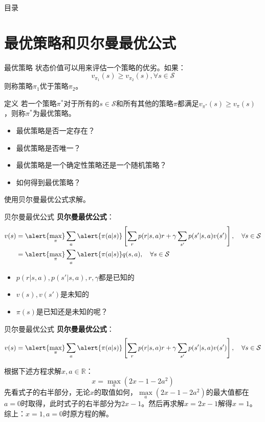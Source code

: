 \begin{frame}{目录}
    \tableofcontents
\end{frame}

\section{最优策略和贝尔曼最优公式}

\begin{frame}{最优策略}
    状态价值可以用来评估一个策略的优劣。如果：
    \[
        v_{\pi_1}(s) \geq v_{\pi_2}(s), \forall s \in \mathcal{S}
    \]
    则称策略$\pi_1$优于策略$\pi_2$。
    \begin{block}{定义}
        若一个策略$\pi^*$对于所有的$s\in \mathcal{S}$和所有其他的策略$\pi$都满足$v_{\pi^*}(s)\geq v_\pi(s)$，则称$\pi^*$为最优策略。
    \end{block}
    \begin{itemize}
        \item 最优策略是否一定存在？
        \item 最优策略是否唯一？
        \item 最优策略是一个确定性策略还是一个随机策略？
        \item 如何得到最优策略？
    \end{itemize}
    使用\alert{贝尔曼最优公式}求解。
\end{frame}

\begin{frame}{贝尔曼最优公式}
    \textbf{贝尔曼最优公式}：
    \[
        \begin{aligned}
            v(s)&=\alert{\underset{\pi}{\max}}\sum_a\alert{\pi(a|s)}\left[\sum_r p(r|s,a)r+\gamma\sum_{s'}p(s'|s,a)v(s')\right], \quad \forall s\in\mathcal{S} \\
            &=\alert{\underset{\pi}{\max}}\sum_a\alert{\pi(a|s)}q(s,a), \quad \forall s\in\mathcal{S}
        \end{aligned}
    \]
    \begin{itemize}
        \item $p(r|s,a),p(s'|s,a),r,\gamma$都是已知的
        \item $v(s),v(s')$是未知的
        \item $\pi(s)$是已知还是未知的呢？
    \end{itemize}
\end{frame}

\begin{frame}{贝尔曼最优公式}
    \textbf{贝尔曼最优公式}：
    \[
        v(s)=\alert{\underset{\pi}{\max}}\sum_a\alert{\pi(a|s)}\left[\sum_r p(r|s,a)r+\gamma\sum_{s'}p(s'|s,a)v(s')\right], \quad \forall s\in\mathcal{S}
    \]
    \begin{examples}
        根据下述方程求解$x,a\in\mathbb{R}$：
        \[
            x=\underset{a}{\max}(2x-1-2a^2)
        \]
        先看式子的右半部分，无论$x$的取值如何，$\underset{a}{\max}(2x-1-2a^2)$的最大值都在$a=0$时取得，此时式子的右半部分为$2x-1$。然后再求解$x=2x-1$解得$x=1$。综上：$x=1,a=0$时原方程的解。
    \end{examples}
\end{frame}

